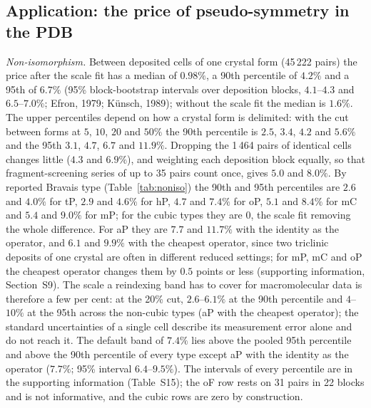 \subsection{Application: the price of pseudo-symmetry in the PDB}
\label{sec:pdb}
\emph{Non-isomorphism.} Between deposited cells of one crystal form (45\,222 pairs) the price after the scale fit has a median of $0.98\%$, a 90th percentile of $4.2\%$ and a 95th of $6.7\%$ (95\% block-bootstrap intervals over deposition blocks, $4.1$--$4.3$ and $6.5$--$7.0\%$; Efron, 1979; K\"unsch, 1989); without the scale fit the median is $1.6\%$. The upper percentiles depend on how a crystal form is delimited: with the cut between forms at $5$, $10$, $20$ and $50\%$ the 90th percentile is $2.5$, $3.4$, $4.2$ and $5.6\%$ and the 95th $3.1$, $4.7$, $6.7$ and $11.9\%$. Dropping the 1\,464 pairs of identical cells changes little ($4.3$ and $6.9\%$), and weighting each deposition block equally, so that fragment-screening series of up to 35 pairs count once, gives $5.0$ and $8.0\%$. By reported Bravais type (Table~\ref{tab:noniso}) the 90th and 95th percentiles are $2.6$ and $4.0\%$ for tP, $2.9$ and $4.6\%$ for hP, $4.7$ and $7.4\%$ for oP, $5.1$ and $8.4\%$ for mC and $5.4$ and $9.0\%$ for mP; for the cubic types they are $0$, the scale fit removing the whole difference. For aP they are $7.7$ and $11.7\%$ with the identity as the operator, and $6.1$ and $9.9\%$ with the cheapest operator, since two triclinic deposits of one crystal are often in different reduced settings; for mP, mC and oP the cheapest operator changes them by $0.5$ points or less (supporting information, Section~S9). The scale a reindexing band has to cover for macromolecular data is therefore a few per cent: at the 20\% cut, $2.6$--$6.1\%$ at the 90th percentile and $4$--$10\%$ at the 95th across the non-cubic types (aP with the cheapest operator); the standard uncertainties of a single cell describe its measurement error alone and do not reach it. The default band of $7.4\%$ lies above the pooled 95th percentile and above the 90th percentile of every type except aP with the identity as the operator ($7.7\%$; 95\% interval $6.4$--$9.5\%$). The intervals of every percentile are in the supporting information (Table~S15); the oF row rests on 31 pairs in 22 blocks and is not informative, and the cubic rows are zero by construction.


